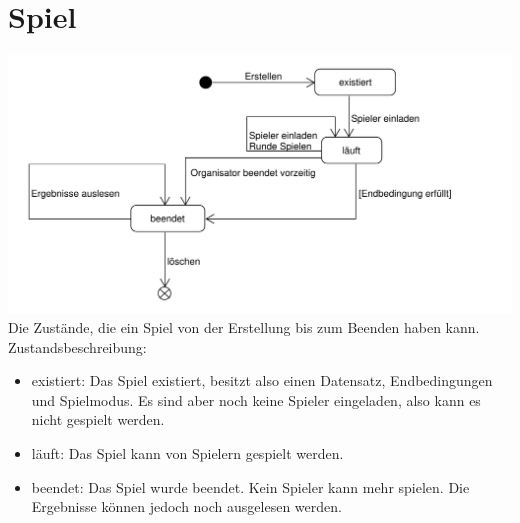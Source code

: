 \documentclass[a4paper]{scrreprt}
\begin{document}
    \section{Spiel}
    \label{fig:Spiel_State}
    \includegraphics[width=\textwidth]{img/Spiel_Zustand.pdf}
    Die Zustände, die ein Spiel von der Erstellung bis zum Beenden haben kann.
    Zustandsbeschreibung:
    \begin{itemize}
        \item existiert: Das Spiel existiert, besitzt also einen Datensatz, Endbedingungen und Spielmodus. Es sind aber noch keine Spieler eingeladen, also kann es nicht gespielt werden.
        \item läuft: Das Spiel kann von Spielern gespielt werden.
        \item beendet: Das Spiel wurde beendet. Kein Spieler kann mehr spielen. Die Ergebnisse können jedoch noch ausgelesen werden.
    \end{itemize}
\end{document}

